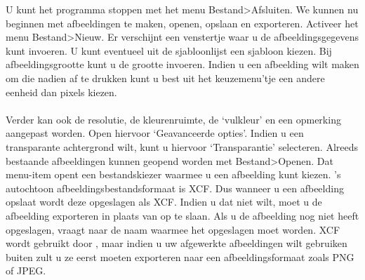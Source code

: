 \documentclass[11pt,a5paper,twoside]{book}
\begin{document}
  U kunt het programma stoppen met het menu Bestand>Afsluiten.  
  We kunnen nu beginnen met afbeeldingen te maken, openen, opslaan
   en exporteren.
   Activeer het menu Bestand>Nieuw. Er verschijnt een venstertje waar u de
    afbeeldingsgegevens kunt invoeren. U kunt eventueel uit de
    sjabloonlijst een sjabloon kiezen.
   Bij afbeeldingsgrootte kunt u de grootte invoeren. Indien u een
    afbeelding wilt maken om die nadien af te drukken kunt u best
    uit het keuzemenu’tje een andere eenheid dan pixels kiezen.
   \\
   \\Verder kan ook de resolutie, de kleurenruimte, de ‘vulkleur’ en een opmerking
    aangepast worden. Open hiervoor ‘Geavanceerde opties’.
   Indien u een transparante achtergrond wilt, kunt u hiervoor ‘Transparantie’
    selecteren.
   Alreeds bestaande afbeeldingen kunnen geopend worden met Bestand>Openen.
   Dat menu-item opent een bestandskiezer waarmee u een afbeelding kunt kiezen.
   \GIMP{}’s autochtoon afbeeldingsbestandsformaat is XCF. Dus wanneer u
    een afbeelding opslaat wordt deze opgeslagen als XCF. Indien u dat niet
    wilt, moet u de afbeelding exporteren in plaats van op te slaan. Als u de
    afbeelding nog niet heeft opgeslagen, vraagt \GIMP{} naar de naam waarmee
    het opgeslagen moet worden.
   XCF wordt gebruikt door \GIMP{}, maar indien
    u uw afgewerkte afbeeldingen wilt gebruiken buiten \GIMP{} zult u ze eerst
    moeten exporteren naar een afbeeldingsformaat zoals PNG of JPEG.
\end{document}
